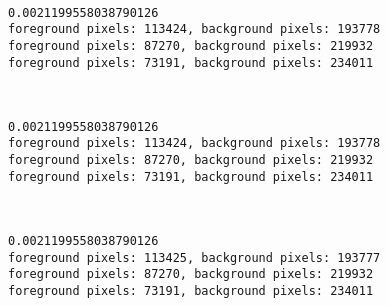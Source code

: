 \documentclass[11pt]{article}
\begin{document}
    \begin{center}
    \end{center}
    { \hspace*{\fill} \\}
    
    \begin{Verbatim}[commandchars=\\\{\}]
0.0021199558038790126
foreground pixels: 113424, background pixels: 193778
foreground pixels: 87270, background pixels: 219932
foreground pixels: 73191, background pixels: 234011

    \end{Verbatim}

    \begin{center}
    \end{center}
    { \hspace*{\fill} \\}
    
    \begin{Verbatim}[commandchars=\\\{\}]
0.0021199558038790126
foreground pixels: 113424, background pixels: 193778
foreground pixels: 87270, background pixels: 219932
foreground pixels: 73191, background pixels: 234011

    \end{Verbatim}

    \begin{center}
    \end{center}
    { \hspace*{\fill} \\}
    
    \begin{Verbatim}[commandchars=\\\{\}]
0.0021199558038790126
foreground pixels: 113425, background pixels: 193777
foreground pixels: 87270, background pixels: 219932
foreground pixels: 73191, background pixels: 234011

    \end{Verbatim}

    \begin{center}
    \end{center}
    { \hspace*{\fill} \\}
    
\end{document}
